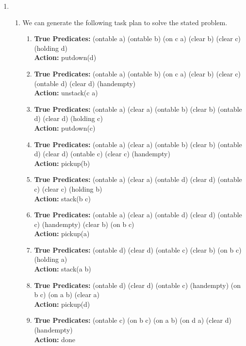 \documentclass[11pt]{article}
\begin{document}
\begin{enumerate}[leftmargin=0.3in]
\begin{enumerate}
   \end{enumerate} %
   
   \item %
   \begin{enumerate}
       \item We can generate the following task plan to solve the stated problem.
           \begin{enumerate}
               \item \textbf{True Predicates:} (ontable a) (ontable b) (on c a) (clear b) (clear c) (holding d) \\
                     \textbf{Action:} putdown(d)
               \item \textbf{True Predicates:} (ontable a) (ontable b) (on c a) (clear b) (clear c) (ontable d) (clear d) (handempty)\\
                     \textbf{Action:} unstack(c a)
               \item \textbf{True Predicates:} (ontable a) (clear a) (ontable b) (clear b) (ontable d) (clear d) (holding c)\\
                     \textbf{Action:} putdown(c)
               \item \textbf{True Predicates:} (ontable a) (clear a) (ontable b) (clear b) (ontable d) (clear d) (ontable c) (clear c) (handempty)\\
                     \textbf{Action:} pickup(b)
               \item \textbf{True Predicates:} (ontable a) (clear a) (ontable d) (clear d) (ontable c) (clear c) (holding b)\\
                     \textbf{Action:} stack(b c)
               \item \textbf{True Predicates:} (ontable a) (clear a) (ontable d) (clear d) (ontable c) (handempty) (clear b) (on b c)\\
                     \textbf{Action:} pickup(a)
               \item \textbf{True Predicates:} (ontable d) (clear d) (ontable c) (clear b) (on b c)(holding a)\\
                     \textbf{Action:} stack(a b)
               \item \textbf{True Predicates:} (ontable d) (clear d) (ontable c) (handempty) (on b c) (on a b) (clear a)\\
                     \textbf{Action:} pickup(d)
               \item \textbf{True Predicates:} (ontable c) (on b c) (on a b) (on d a) (clear d) (handempty)\\
                     \textbf{Action:} done
           \end{enumerate}


\end{enumerate}
\end{enumerate}
\end{document}
